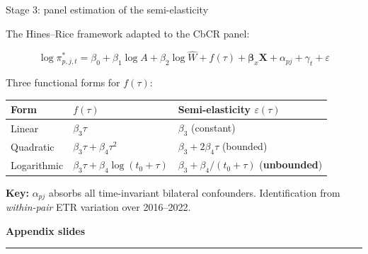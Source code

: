 \documentclass[aspectratio=169, 11pt]{beamer}
\newcommand{\highlight}[1]{\textcolor{DkOrange}{\textbf{#1}}}
\newcommand{\emphbx}[1]{\textcolor{Bordeaux}{\textbf{#1}}}
\begin{document}
\begin{frame}{Stage 3: panel estimation of the semi-elasticity}

The Hines--Rice framework adapted to the CbCR panel:

$$\log \pi_{p,j,t}^{*} = \beta_0 + \beta_1 \log A + \beta_2 \log \hat{W} + f(\tau) + \boldsymbol{\beta}_x \mathbf{X} + \alpha_{pj} + \gamma_t + \varepsilon$$

\vspace{0.3em}
Three functional forms for $f(\tau)$:

\vspace{0.3em}
\begin{center}
\small
\begin{tabular}{@{}lll@{}}
  \toprule
  \textbf{Form} & $f(\tau)$ & \textbf{Semi-elasticity} $\varepsilon(\tau)$ \\
  \midrule
  Linear & $\beta_3 \tau$ & $\beta_3$ \quad (constant) \\[4pt]
  Quadratic & $\beta_3 \tau + \beta_4 \tau^2$ & $\beta_3 + 2\beta_4 \tau$ \quad (bounded) \\[4pt]
  Logarithmic & $\beta_3 \tau + \beta_4 \log(t_0 + \tau)$ & $\beta_3 + \beta_4/(t_0 + \tau)$ \quad (\emphbx{unbounded}) \\
  \bottomrule
\end{tabular}
\end{center}

\vspace{0.5em}
\highlight{Key:} $\alpha_{pj}$ absorbs all time-invariant bilateral confounders. Identification from \emph{within-pair} ETR variation over 2016--2022.
\end{frame}

\appendix

{
\begin{frame}[plain]
  \vfill
  \centering
  {\color{Ivory}\LARGE\bfseries Appendix slides}\\[0.6em]
  {\color{DkOrange}\rule{4cm}{2pt}}
  \vfill
\end{frame}
}
\end{document}
